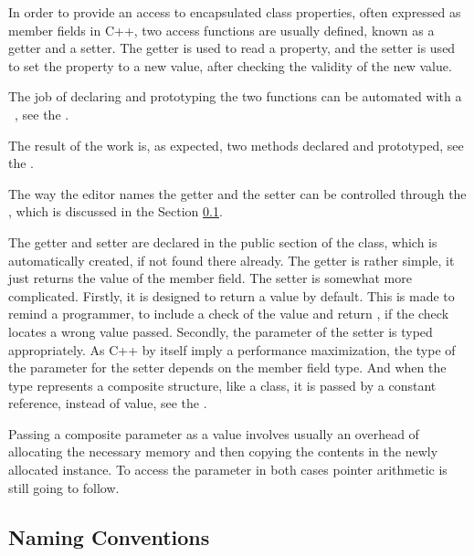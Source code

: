 In order to provide an access to encapsulated class properties, often expressed as member fields in C++, 
two access functions are usually defined, known as a getter and a setter. The getter is used to read a property,
and the setter is used to set the property to a new value, after checking the validity of the new value.

The job of declaring and prototyping the two functions can be automated with a \jbmps\ , see the .


The result of the  work is, as expected, two methods declared and prototyped, see the .


The way the editor names the getter and the setter can be controlled through the  , which
is discussed in the Section \ref{namingconventions}.

The getter and setter are declared in the public section of the class, which is automatically created, if
not found there already.
The getter is rather simple, it just returns the value of the member field.
The setter is somewhat more complicated. 
Firstly, it is designed to return a  value by default. This is made
to remind a programmer, to include a check of the value and return , if the check locates a wrong value passed. 
Secondly, the parameter of the setter is typed appropriately. As C++ by itself imply a performance maximization, the type
of the parameter for the setter depends on the member field type. And when the type represents a composite
structure, like a class, it is passed by a constant reference, instead of value, see the .


Passing a composite parameter as a value involves usually an overhead of allocating the necessary memory and 
then copying the contents in the newly allocated instance. To access the parameter in both cases pointer
arithmetic is still going to follow.

\subsection{Naming Conventions}
\label{namingconventions}

